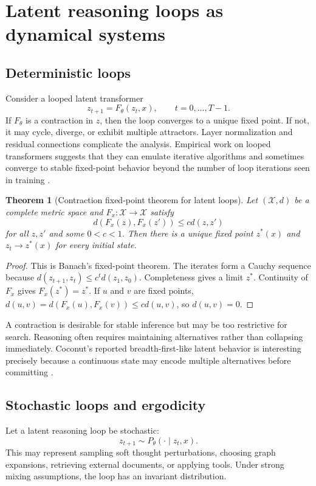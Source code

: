 \documentclass[11pt]{article}
\newtheorem{theorem}[definition]{Theorem}
\newcommand{\calX}{\mathcal{X}}
\newcommand{\1}{\mathbf{1}}
\begin{document}
\section{Latent reasoning loops as dynamical systems}

\subsection{Deterministic loops}

Consider a looped latent transformer
\[
z_{t+1}=F_\theta(z_t,x),\qquad t=0,\ldots,T-1.
\]
If $F_\theta$ is a contraction in $z$, then the loop converges to a unique fixed point. If not, it may cycle, diverge, or exhibit multiple attractors. Layer normalization and residual connections complicate the analysis. Empirical work on looped transformers suggests that they can emulate iterative algorithms and sometimes converge to stable fixed-point behavior beyond the number of loop iterations seen in training \cite{YangLooped2024,Saunshi2025}.

\begin{theorem}[Contraction fixed-point theorem for latent loops]
Let $(\calX,d)$ be a complete metric space and $F_x:\calX\to\calX$ satisfy
\[
d(F_x(z),F_x(z'))\le c d(z,z')
\]
for all $z,z'$ and some $0<c<1$. Then there is a unique fixed point $z^*(x)$ and $z_t\to z^*(x)$ for every initial state.
\end{theorem}
\begin{proof}
This is Banach's fixed-point theorem. The iterates form a Cauchy sequence because $d(z_{t+1},z_t)\le c^t d(z_1,z_0)$. Completeness gives a limit $z^*$. Continuity of $F_x$ gives $F_x(z^*)=z^*$. If $u$ and $v$ are fixed points, $d(u,v)=d(F_x(u),F_x(v))\le c d(u,v)$, so $d(u,v)=0$.
\end{proof}

A contraction is desirable for stable inference but may be too restrictive for search. Reasoning often requires maintaining alternatives rather than collapsing immediately. Coconut's reported breadth-first-like latent behavior is interesting precisely because a continuous state may encode multiple alternatives before committing \cite{Hao2024}.

\subsection{Stochastic loops and ergodicity}

Let a latent reasoning loop be stochastic:
\[
z_{t+1}\sim P_\theta(\cdot\mid z_t,x).
\]
This may represent sampling soft thought perturbations, choosing graph expansions, retrieving external documents, or applying tools. Under strong mixing assumptions, the loop has an invariant distribution.
\end{document}
